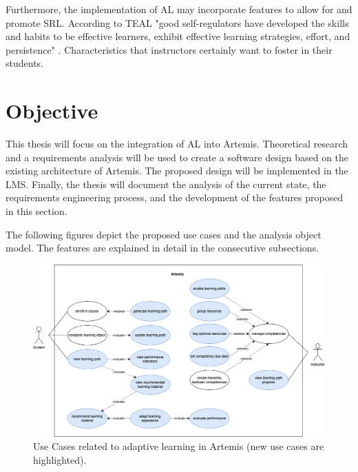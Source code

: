 \documentclass[a4paper,12pt,twoside]{article}
\begin{document}
Furthermore, the implementation of \ac{AL} may incorporate features to allow for and promote \ac{SRL}. According to TEAL
"good self-regulators have developed the skills and habits to be effective learners, exhibit effective learning strategies, effort, and persistence" \cite{no2012self}.
Characteristics that instructors certainly want to foster in their students.


\section{Objective}

This thesis will focus on the integration of \ac{AL} into Artemis.
Theoretical research and a requirements analysis will be used to create a software design based on the existing architecture of Artemis. The proposed
design will be implemented in the \ac{LMS}. Finally, the thesis will document the analysis of the current state, the requirements engineering process,
and the development of the features proposed in this section.

The following figures depict the proposed use cases and the analysis object model. The features are explained in detail in the consecutive subsections.

\begin{figure}[h!]
        \centering
        \includegraphics[width=\linewidth]{figures/UseCases(3).png}
        \caption{Use Cases related to adaptive learning in Artemis (new use cases are highlighted).}
        \label{fig:UseCases}
\end{figure}
\end{document}
